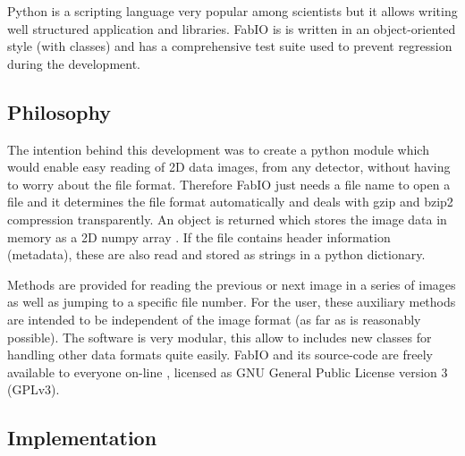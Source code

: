 \documentclass{iucr}
\begin{document}
Python \cite{python} is a scripting language very popular among scientists but
it allows writing well structured application and libraries. FabIO is is
written in an object-oriented style (with classes) and has a comprehensive test suite
used to prevent regression during the development.

\subsection{Philosophy}

The intention behind this development was to create a python module which would enable easy reading
of 2D data images, from any detector, without having to worry about
the file format.
Therefore FabIO just needs a file name to open a file and it determines the
file format automatically and deals with gzip \cite{gzip} and bzip2
\cite{bzip2} compression transparently.
An object is returned which stores the image data in memory as a 2D
numpy array \cite{numpy}.
If the file contains header information (metadata), these are also read and stored
as strings in a python dictionary.

Methods are provided for reading the previous or next image in
a series of images as well as jumping to a specific file number.
For the user, these auxiliary methods are intended to be independent of
the image format (as far as is reasonably possible).
The software is very modular, this allow to includes new classes for handling 
other data formats quite easily. 
FabIO and its source-code are freely available to everyone on-line \cite{fabio}, 
licensed as GNU General Public License version 3 (GPLv3). 

\subsection{Implementation}
\end{document}
